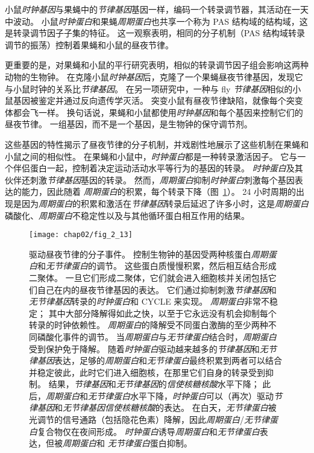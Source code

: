小鼠\textit{时钟基因}与果蝇中的\textit{节律基因}基因一样，编码一个转录调节器，其活动在一天中波动。
小鼠\textit{时钟蛋白}和果蝇\textit{周期蛋白}也共享一个称为 PAS 结构域的结构域，这是转录调节因子子集的特征。
这一观察表明，相同的分子机制（PAS 结构域转录调节的振荡）控制着果蝇和小鼠的昼夜节律。


更重要的是，对果蝇和小鼠的平行研究表明，相似的转录调节因子组会影响这两种动物的生物钟。
在克隆小鼠\textit{时钟基因}后，克隆了一个果蝇昼夜节律基因，发现它与小鼠时钟的关系比\textit{节律基因}。
在另一项研究中，一种与 fly \textit{节律基因}相似的小鼠基因被鉴定并通过反向遗传学灭活。
突变小鼠有昼夜节律缺陷，就像每个突变体都会飞一样。 
换句话说，果蝇和小鼠都使用\textit{时钟基因}和每个基因来控制它们的昼夜节律。
一组基因，而不是一个基因，是生物钟的保守调节剂。


这些基因的特性揭示了昼夜节律的分子机制，并戏剧性地展示了这些机制在果蝇和小鼠之间的相似性。
在果蝇和小鼠中，\textit{时钟蛋白}都是一种转录激活因子。 
它与一个伴侣蛋白一起，控制着决定运动活动水平等行为的基因的转录。
\textit{时钟蛋白}及其伙伴还刺激\textit{节律基因}基因的转录。
然而，\textit{周期蛋白}抑制\textit{时钟蛋白}刺激每个基因表达的能力，因此随着 \textit{周期蛋白}的积累，每个转录下降（图~\ref{fig:2_13}）。
24 小时周期的出现是因为\textit{周期蛋白}的积累和激活在\textit{节律基因}转录后延迟了许多小时，这是\textit{周期蛋白}磷酸化、\textit{周期蛋白}不稳定性以及与其他循环蛋白相互作用的结果。



\begin{figure}[htbp]
	\centering
	\texttt{[image: chap02/fig\_2\_13]}
	\caption{驱动昼夜节律的分子事件。
		控制生物钟的基因受两种核蛋白\textit{周期蛋白}和\textit{无节律蛋白}的调节。
		这些蛋白质慢慢积累，然后相互结合形成二聚体。
		一旦它们形成二聚体，它们就会进入细胞核并关闭包括它们自己在内的昼夜节律基因的表达。
		它们通过抑制刺激\textit{节律基因}和\textit{无节律基因}转录的\textit{时钟蛋白}和 CYCLE 来实现。
		\textit{周期蛋白}非常不稳定；
		其中大部分降解得如此之快，以至于它永远没有机会抑制每个转录的时钟依赖性。 
		\textit{周期蛋白}的降解受不同蛋白激酶的至少两种不同磷酸化事件的调节。
		当\textit{周期蛋白}与\textit{无节律蛋白}结合时，\textit{周期蛋白}受到保护免于降解。 
		随着\textit{时钟蛋白}驱动越来越多的\textit{节律基因}和\textit{无节律基因}表达，足够的\textit{周期蛋白}和\textit{无节律蛋白}最终积累到两者可以结合并稳定彼此，此时它们进入细胞核，在那里它们自身的转录受到抑制。
		结果，\textit{节律基因}和\textit{无节律基因}的\textit{信使核糖核酸}水平下降； 此后，\textit{周期蛋白}和\textit{无节律蛋白}水平下降，\textit{时钟蛋白}可以（再次）驱动\textit{节律基因}和\textit{无节律基因}\textit{信使核糖核酸}的表达。
		在白天，\textit{无节律蛋白}被光调节的信号通路（包括隐花色素）降解，因此\textit{周期蛋白}/\textit{无节律蛋白}复合物仅在夜间形成。
		\textit{时钟蛋白}诱导\textit{周期蛋白}和\textit{无节律蛋白}表达，但被\textit{周期蛋白}和 \textit{无节律蛋白}蛋白抑制。}
	\label{fig:2_13}
\end{figure}


